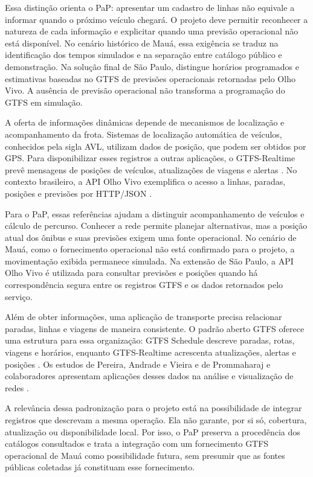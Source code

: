 \documentclass[12pt,oneside,a4paper,brazil,chapter=TITLE]{abntex2}
\begin{document}
Essa distinção orienta o PaP: apresentar um cadastro de linhas não equivale a informar quando o próximo veículo chegará. O projeto deve permitir reconhecer a natureza de cada informação e explicitar quando uma previsão operacional não está disponível. No cenário histórico de Mauá, essa exigência se traduz na identificação dos tempos simulados e na separação entre catálogo público e demonstração. Na solução final de São Paulo, distingue horários programados e estimativas baseadas no GTFS de previsões operacionais retornadas pelo Olho Vivo. A ausência de previsão operacional não transforma a programação do GTFS em simulação.

A oferta de informações dinâmicas depende de mecanismos de localização e acompanhamento da frota. Sistemas de localização automática de veículos, conhecidos pela sigla AVL, utilizam dados de posição, que podem ser obtidos por GPS. Para disponibilizar esses registros a outras aplicações, o GTFS-Realtime prevê mensagens de posições de veículos, atualizações de viagens e alertas \citep{gtfs}. No contexto brasileiro, a API Olho Vivo exemplifica o acesso a linhas, paradas, posições e previsões por HTTP/JSON \citep{sptransapi}.

Para o PaP, essas referências ajudam a distinguir acompanhamento de veículos e cálculo de percurso. Conhecer a rede permite planejar alternativas, mas a posição atual dos ônibus e suas previsões exigem uma fonte operacional. No cenário de Mauá, como o fornecimento operacional não está confirmado para o projeto, a movimentação exibida permanece simulada. Na extensão de São Paulo, a API Olho Vivo é utilizada para consultar previsões e posições quando há correspondência segura entre os registros GTFS e os dados retornados pelo serviço.

Além de obter informações, uma aplicação de transporte precisa relacionar paradas, linhas e viagens de maneira consistente. O padrão aberto GTFS oferece uma estrutura para essa organização: GTFS Schedule descreve paradas, rotas, viagens e horários, enquanto GTFS-Realtime acrescenta atualizações, alertas e posições \citep{gtfs}. Os estudos de Pereira, Andrade e Vieira e de Prommaharaj e colaboradores apresentam aplicações desses dados na análise e visualização de redes \citep{pereira2023,prommaharaj2020}.

A relevância dessa padronização para o projeto está na possibilidade de integrar registros que descrevam a mesma operação. Ela não garante, por si só, cobertura, atualização ou disponibilidade local. Por isso, o PaP preserva a procedência dos catálogos consultados e trata a integração com um fornecimento GTFS operacional de Mauá como possibilidade futura, sem presumir que as fontes públicas coletadas já constituam esse fornecimento.
\end{document}
